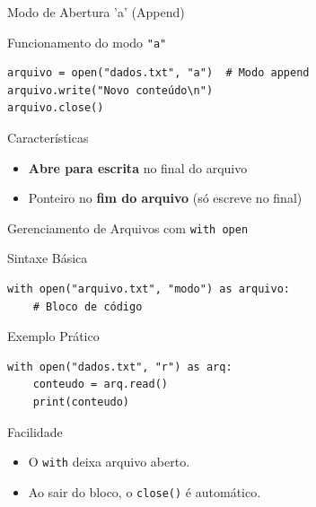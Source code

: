 \begin{frame}[fragile]{Modo de Abertura 'a' (Append)}
    \begin{block}{Funcionamento do modo \texttt{"a"}}
        \begin{verbatim}
arquivo = open("dados.txt", "a")  # Modo append
arquivo.write("Novo conteúdo\n")
arquivo.close()
        \end{verbatim}
    \end{block}

            \begin{alertblock}{Características}
                \begin{itemize}
                    \item \textbf{Abre para escrita} no final do arquivo
                    
                    \item Ponteiro no \textbf{fim do arquivo} (só escreve no final)
                \end{itemize}
            \end{alertblock}

        

\end{frame}


\begin{frame}[fragile]{Gerenciamento de Arquivos com \texttt{with open}}
    \begin{block}{Sintaxe Básica}
        \begin{verbatim}
with open("arquivo.txt", "modo") as arquivo:
    # Bloco de código
        \end{verbatim}
    \end{block}

            \begin{exampleblock}{Exemplo Prático}
                \begin{verbatim}
with open("dados.txt", "r") as arq:
    conteudo = arq.read()
    print(conteudo)
                \end{verbatim}
            \end{exampleblock}
   

    \begin{block}{Facilidade}
    \begin{itemize}
        \item O \texttt{with} deixa arquivo aberto.
        \item Ao sair do bloco, o \texttt{close()} é  automático.
    \end{itemize}
         
    \end{block}
\end{frame}


